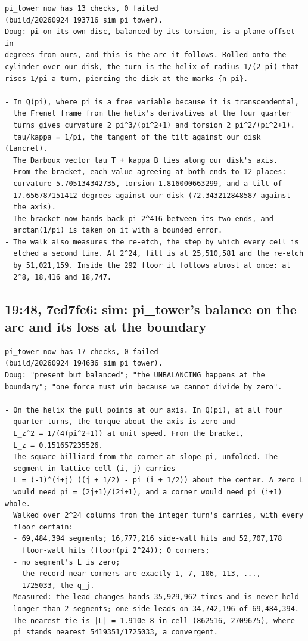 \begin{Verbatim}
pi_tower now has 13 checks, 0 failed (build/20260924_193716_sim_pi_tower).
Doug: pi on its own disc, balanced by its torsion, is a plane offset in
degrees from ours, and this is the arc it follows. Rolled onto the
cylinder over our disk, the turn is the helix of radius 1/(2 pi) that
rises 1/pi a turn, piercing the disk at the marks {n pi}.

- In Q(pi), where pi is a free variable because it is transcendental,
  the Frenet frame from the helix's derivatives at the four quarter
  turns gives curvature 2 pi^3/(pi^2+1) and torsion 2 pi^2/(pi^2+1).
  tau/kappa = 1/pi, the tangent of the tilt against our disk (Lancret).
  The Darboux vector tau T + kappa B lies along our disk's axis.
- From the bracket, each value agreeing at both ends to 12 places:
  curvature 5.705134342735, torsion 1.816000663299, and a tilt of
  17.656787151412 degrees against our disk (72.343212848587 against
  the axis).
- The bracket now hands back pi 2^416 between its two ends, and
  arctan(1/pi) is taken on it with a bounded error.
- The walk also measures the re-etch, the step by which every cell is
  etched a second time. At 2^24, fill is at 25,510,581 and the re-etch
  by 51,021,159. Inside the 292 floor it follows almost at once: at
  2^8, 18,416 and 18,747.
\end{Verbatim}

\subsection{\texorpdfstring{19:48, 7ed7fc6: sim: pi\_\allowbreak{}tower's balance on the arc and its loss at the boundary}{19:48, 7ed7fc6: sim: pi\_tower's balance on the arc and its loss at the boundary}}

\begin{Verbatim}
pi_tower now has 17 checks, 0 failed (build/20260924_194636_sim_pi_tower).
Doug: "present but balanced"; "the UNBALANCING happens at the
boundary"; "one force must win because we cannot divide by zero".

- On the helix the pull points at our axis. In Q(pi), at all four
  quarter turns, the torque about the axis is zero and
  L_z^2 = 1/(4(pi^2+1)) at unit speed. From the bracket,
  L_z = 0.151657235526.
- The square billiard from the corner at slope pi, unfolded. The
  segment in lattice cell (i, j) carries
  L = (-1)^(i+j) ((j + 1/2) - pi (i + 1/2)) about the center. A zero L
  would need pi = (2j+1)/(2i+1), and a corner would need pi (i+1) whole.
  Walked over 2^24 columns from the integer turn's carries, with every
  floor certain:
  - 69,484,394 segments; 16,777,216 side-wall hits and 52,707,178
    floor-wall hits (floor(pi 2^24)); 0 corners;
  - no segment's L is zero;
  - the record near-corners are exactly 1, 7, 106, 113, ...,
    1725033, the q_j.
  Measured: the lead changes hands 35,929,962 times and is never held
  longer than 2 segments; one side leads on 34,742,196 of 69,484,394.
  The nearest tie is |L| = 1.910e-8 in cell (862516, 2709675), where
  pi stands nearest 5419351/1725033, a convergent.
\end{Verbatim}

